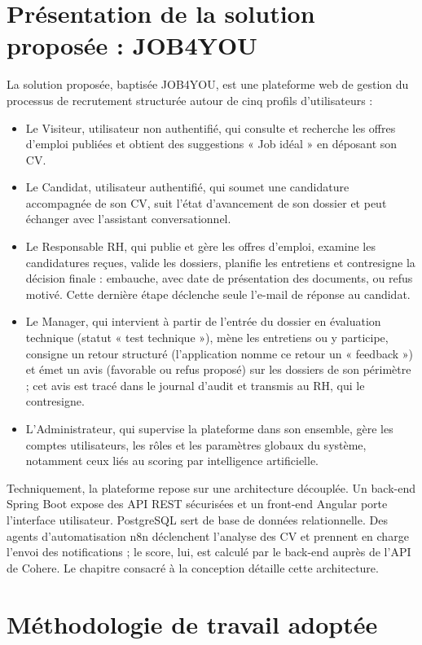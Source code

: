 \documentclass[]{./tpl/isipfe}
\begin{document}
\section{Présentation de la solution proposée : JOB4YOU}
\label{sec_1_6}
La solution proposée, baptisée JOB4YOU, est une plateforme web de gestion du processus de recrutement structurée autour de cinq profils d’utilisateurs :

\begin{itemize}
\item Le Visiteur, utilisateur non authentifié, qui consulte et recherche les offres d’emploi publiées et obtient des suggestions « Job idéal » en déposant son CV.
\item Le Candidat, utilisateur authentifié, qui soumet une candidature accompagnée de son CV, suit l’état d’avancement de son dossier et peut échanger avec l’assistant conversationnel.
\item Le Responsable RH, qui publie et gère les offres d’emploi, examine les candidatures reçues, valide les dossiers, planifie les entretiens et contresigne la décision finale : embauche, avec date de présentation des documents, ou refus motivé. Cette dernière étape déclenche seule l’e-mail de réponse au candidat.
\item Le Manager, qui intervient à partir de l’entrée du dossier en évaluation technique (statut « test technique »), mène les entretiens ou y participe, consigne un retour structuré (l’application nomme ce retour un « feedback ») et émet un avis (favorable ou refus proposé) sur les dossiers de son périmètre ; cet avis est tracé dans le journal d’audit et transmis au RH, qui le contresigne.
\item L’Administrateur, qui supervise la plateforme dans son ensemble, gère les comptes utilisateurs, les rôles et les paramètres globaux du système, notamment ceux liés au scoring par intelligence artificielle.
\end{itemize}

Techniquement, la plateforme repose sur une architecture découplée. Un back-end Spring Boot expose des API REST sécurisées et un front-end Angular porte l’interface utilisateur. PostgreSQL sert de base de données relationnelle. Des agents d’automatisation n8n déclenchent l’analyse des CV et prennent en charge l’envoi des notifications ; le score, lui, est calculé par le back-end auprès de l’API de Cohere. Le chapitre consacré à la conception détaille cette architecture.

\section{Méthodologie de travail adoptée}
\label{sec_1_7}
\end{document}
